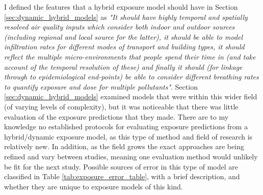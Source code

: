 I defined the features that a hybrid exposure model should have in Section \ref{sec:dynamic_hybrid_models} as \textit{"It should have highly temporal and spatially resolved air quality inputs which consider both indoor and outdoor sources (including regional and local source for the latter), it should be able to model infiltration rates for different modes of transport and building types, it should reflect the multiple micro-environments that people spend their time in (and take account of the temporal resolution of these) and finally it should (for linkage through to epidemiological end-points) be able to consider different breathing rates to quantify exposure and dose for multiple pollutants"}. Section \ref{sec:dynamic_hybrid_models} examined models that were within this wider field (of varying levels of complexity), but it was noticeable that there was little evaluation of the exposure predictions that they made. There are to my knowledge no established protocols for evaluating exposure predictions from a hybrid/dynamic exposure model, as this type of method and field of research is relatively new. In addition, as the field grows the exact approaches are being refined and vary between studies, meaning one evaluation method would unlikely be fit for the next study. Possible sources of error in this type of model are classified in Table \ref{tab:exposure_error_table}, with a brief description, and whether they are unique to exposure models of this kind.

